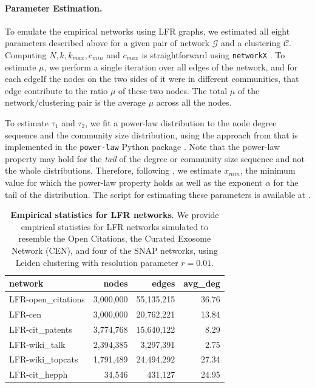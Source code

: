\documentclass[11pt]{article}   	%
\begin{document}
\paragraph{Parameter Estimation.} To emulate the empirical networks using LFR graphs, we estimated all eight parameters described above for a given pair of network $\mathcal{G}$ and a clustering $\mathcal{C}$. Computing $N, k, k_{max}, c_{min}$ and $c_{max}$ is straightforward using \texttt{networkX} \citep{hagberg2008exploring}. To estimate $\mu$, we perform a single iteration over all edges of the network, and for each edgeIf the nodes on the two sides of it were in different communities, that edge contribute to the ratio $\mu$ of these two nodes. The total $\mu$ of the network/clustering pair is the average $\mu$ across all the nodes.

To estimate $\tau_1$ and $\tau_2$, we fit a power-law distribution to the node degree sequence and the community size distribution, using the approach from \cite{clauset2009power} that is implemented in the \texttt{power-law} Python package \citep{alstott2014powerlaw}. Note that the power-law property may hold for the \textit{tail} of the degree or community size sequence and not the whole distributions. Therefore, following \cite{clauset2009power}, we estimate $x_{min}$, the minimum value for which the power-law property holds as well as the exponent $\alpha$ for the tail of the distribution. The script for estimating these parameters is available at \cite{analysis_scripts}.

\begin{table}[ht]
\centering
\begin{tabular}{lrrr}
  \hline
 network & nodes & edges & avg\_deg \\
  \hline
    LFR-open\_citations & 3,000,000  & 55,135,215 & 36.76 \\
    LFR-cen & 3,000,000 & 20,762,221 & 13.84 \\
    LFR-cit\_patents & 3,774,768 & 15,640,122 & 8.29 \\
    LFR-wiki\_talk & 2,394,385 & 3,297,391 & 2.75 \\
    LFR-wiki\_topcats & 1,791,489 & 24,494,292 & 27.34 \\
    LFR-cit\_hepph &  34,546 & 431,127 & 24.95 \\
 \hline
\end{tabular}
\caption{\textbf{Empirical statistics for LFR networks}. We provide empirical statistics for LFR networks simulated to  resemble the Open Citations, the Curated Exosome Network (CEN), and four of the SNAP networks, using Leiden clustering with resolution parameter $r=0.01$. }
\label{tab:empirical-stats-LFR}
\end{table}
\end{document}
